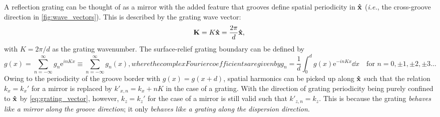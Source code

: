 \documentclass{article}
\begin{document}
A reflection grating can be thought of as a mirror with the added feature that grooves define spatial periodicity in $\vu{x}$ (\emph{i.e.}, the cross-groove direction in \cref{fig:wave_vectors}). 
This is described by the grating wave vector:
\begin{equation}\label{eq:grating_vector}
    \vb{K} = K \vu{x} = \frac{2 \pi}{d} \vu{x} ,
\end{equation}
with $K = 2 \pi / d$ as the grating wavenumber. 
The surface-relief grating boundary can be defined by
\begin{subequations}%
\begin{equation} \label{eq:groove_fourier_series}
 g(x) = \sum_{n=-\infty}^{\infty} g_n \mathrm{e}^{i n K x} \equiv \sum_{n=-\infty}^{\infty} g_n (x), 
 \end{equation} 
where the complex Fourier coefficients are given by
\begin{equation} \label{eq:groove_fourier_coeff}
 g_n = \frac{1}{d} \int_{0}^{d} g \left( x \right) \mathrm{e}^{- i n K x} \dd{x} \quad \text{for } n = 0, \pm 1, \pm 2, \pm 3 \dotsc 
 \end{equation} 
\end{subequations}
Owing to the periodicity of the groove border with $g(x) = g(x+d)$, spatial harmonics can be picked up along $\vu{x}$ such that the relation $k_x = k_x'$ for a mirror is replaced by $k'_{x,n} = k_x + n K$ in the case of a grating. 
With the direction of grating periodicity being purely confined to $\vu{x}$ by \cref{eq:grating_vector}, however, $k_z = k_z'$ for the case of a mirror is still valid such that $k'_{z,n} = k_z$. 
This is because the grating \emph{behaves like a mirror along the groove direction}; it only \emph{behaves like a grating along the dispersion direction}. 
\end{document}
